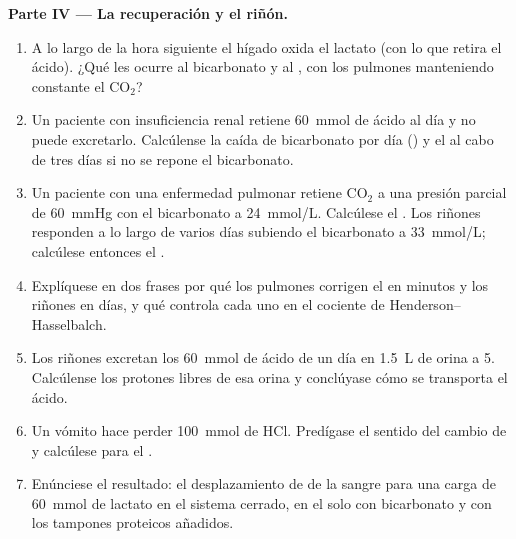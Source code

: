 \begin{problem}
\medskip
\noindent\textbf{Parte IV --- La recuperación y el riñón.}
\begin{enumerate}[resume]
  \item A lo largo de la hora siguiente el hígado oxida el lactato (con lo
        que retira el ácido). ¿Qué les ocurre al bicarbonato y al , con
        los pulmones manteniendo constante el $\mathrm{CO_2}$?
  \item Un paciente con insuficiencia renal retiene \qty{60}{mmol} de
        ácido al día y no puede excretarlo. Calcúlense la caída de
        bicarbonato por día () y el  al cabo de tres días
        si no se repone el bicarbonato.
  \item Un paciente con una enfermedad pulmonar retiene $\mathrm{CO_2}$ a
        una presión parcial de \qty{60}{mmHg} con el bicarbonato a
        \qty{24}{mmol/L}. Calcúlese el . Los riñones responden a lo
        largo de varios días subiendo el bicarbonato a \qty{33}{mmol/L};
        calcúlese entonces el .
  \item Explíquese en dos frases por qué los pulmones corrigen el  en
        minutos y los riñones en días, y qué controla cada uno en el
        cociente de Henderson--Hasselbalch.
  \item Los riñones excretan los \qty{60}{mmol} de ácido de un día en
        \qty{1.5}{L} de orina a  5. Calcúlense los protones libres de esa
        orina y conclúyase cómo se transporta el ácido.
  \item Un vómito hace perder \qty{100}{mmol} de HCl. Predígase el sentido
        del cambio de  y calcúlese para el .
  \item Enúnciese el resultado: el desplazamiento de  de la sangre para
        una carga de \qty{60}{mmol} de lactato en el sistema cerrado, en el
         solo con bicarbonato y con los tampones proteicos
        añadidos.
\end{enumerate}
\end{problem}
